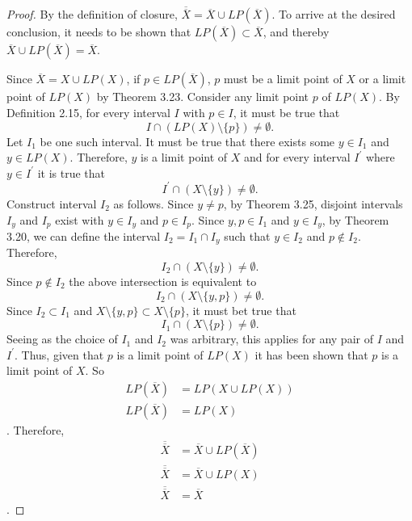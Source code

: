 \documentclass{amsart}
\newcommand{\1}{\mathds{1}}
\numberwithin{equation}{section}
\numberwithin{theorem}{section}
\begin{document}
\begin{proof}
	By the definition of closure, $\overline{\overline{X}} = \overline{X} \cup LP(\overline{X})$. To arrive at the desired conclusion, it needs to be shown that $LP(\overline{X})\subset \overline{X}$, and thereby $\overline{X} \cup LP(\overline{X}) = \overline{X}$. 
	
	Since $\overline{X} = X \cup LP(X)$, if $p\in LP(\overline{X})$, $p$ must be a limit point of $X$ or a limit point of $LP(X)$ by Theorem 3.23. Consider any limit point $p$ of $LP(X)$. By Definition 2.15, for every interval $I$ with $p\in I$, it must be true that $$I \cap (LP(X)\setminus \{p\}) \not= \emptyset.$$ Let $I_1$ be one such interval. It must be true that there exists some $y\in I_1$ and $y\in LP(X)$. Therefore, $y$ is a limit point of $X$ and for every interval $I^\prime$ where $y\in I^\prime$ it is true that $$I^\prime \cap (X\setminus \{y\}) \not= \emptyset.$$ Construct interval $I_2$ as follows. Since $y\not=p$, by Theorem 3.25, disjoint intervals $I_y$ and $I_p$ exist with $y\in I_y$ and $p\in I_p$. Since $y,p\in I_1$ and $y\in I_y$, by Theorem 3.20, we can define the interval $I_2 = I_1 \cap I_y$ such that $y\in I_2$ and $p\notin I_2$. Therefore, $$I_2 \cap (X\setminus \{y\}) \not= \emptyset.$$ Since $p\notin I_2$ the above intersection is equivalent to $$I_2 \cap (X\setminus \{y,p\}) \not= \emptyset.$$ Since $I_2\subset I_1$ and $X\setminus \{y,p\} \subset X\setminus \{p\}$, it must bet true that $$I_1 \cap (X\setminus \{p\}) \not= \emptyset.$$  Seeing as the choice of $I_1$ and $I_2$ was arbitrary, this applies for any pair of $I$ and $I^\prime$. Thus, given that $p$ is a limit point of $LP(X)$ it has been shown that $p$ is a limit point of $X$. So
	\[\begin{split}
		LP(\overline{X}) &= LP(X\cup LP(X))\\
		LP(\overline{X}) &= LP(X)
	\end{split}\].
	Therefore,
	\[\begin{split}
		\overline{\overline{X}} &= \overline{X} \cup LP(\overline{X})\\
		\overline{\overline{X}} &= \overline{X} \cup LP(X)\\
		\overline{\overline{X}} &= \overline{X}
	\end{split}\].
	

\end{proof}
\end{document}
